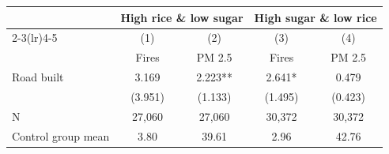 {
\def\sym#1{\ifmmode^{#1}\else\(^{#1}\)\fi}
\begin{tabular}{l*{4}{c}}
\hline\hline
                         &\multicolumn{2}{c}{High rice \& low sugar}&\multicolumn{2}{c}{High sugar \& low rice}\\\cmidrule(lr){2-3}\cmidrule(lr){4-5}
                         &\multicolumn{1}{c}{(1)}&\multicolumn{1}{c}{(2)}&\multicolumn{1}{c}{(3)}&\multicolumn{1}{c}{(4)}\\
                         &\multicolumn{1}{c}{Fires}&\multicolumn{1}{c}{PM 2.5}&\multicolumn{1}{c}{Fires}&\multicolumn{1}{c}{PM 2.5}\\
\hline
Road built               &       3.169   &       2.223** &       2.641*  &       0.479   \\
                         &     (3.951)   &     (1.133)   &     (1.495)   &     (0.423)   \\
\hline
N                        &      27,060   &      27,060   &      30,372   &      30,372   \\
Control group mean       &        3.80   &       39.61   &        2.96   &       42.76   \\
\hline\hline
\end{tabular}
}
